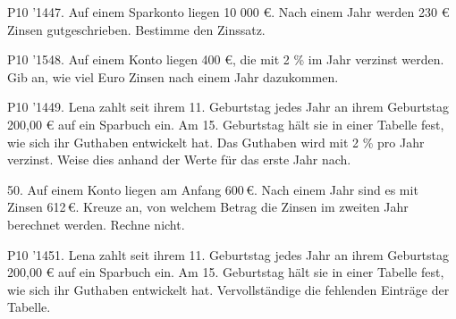 \documentclass[11pt]{article}
\begin{document}
\pfgruppe{}
\begin{pfaufg}{P10 ’14}{47.}{}
Auf einem Sparkonto liegen 10 000 €. Nach einem Jahr werden 230 € Zinsen gutgeschrieben. Bestimme den Zinssatz.
\end{pfaufg}
\begin{pfaufg}{P10 ’15}{48.}{}
Auf einem Konto liegen 400 €, die mit 2 \% im Jahr verzinst werden. Gib an, wie viel Euro Zinsen nach einem Jahr dazukommen.
\end{pfaufg}
\pfgruppe{}
\begin{pfaufg}{P10 ’14}{49.}{}
Lena zahlt seit ihrem 11. Geburtstag jedes Jahr an ihrem Geburtstag 200,00 € auf ein Sparbuch ein. Am 15. Geburtstag hält sie in einer Tabelle fest, wie sich ihr Guthaben entwickelt hat. Das Guthaben wird mit 2 \% pro Jahr verzinst. Weise dies anhand der Werte für das erste Jahr nach.
\par\smallskip\noindent {}\par
{}
\end{pfaufg}
\pfgruppe{}
\begin{pfaufg}{}{50.}{}
Auf einem Konto liegen am Anfang 600\,€. Nach einem Jahr sind es mit Zinsen 612\,€. Kreuze an, von welchem Betrag die Zinsen im zweiten Jahr berechnet werden. Rechne nicht. 
\end{pfaufg}
\pfgruppe{}
\begin{pfaufg}{P10 ’14}{51.}{}
Lena zahlt seit ihrem 11. Geburtstag jedes Jahr an ihrem Geburtstag 200,00 € auf ein Sparbuch ein. Am 15. Geburtstag hält sie in einer Tabelle fest, wie sich ihr Guthaben entwickelt hat. Vervollständige die fehlenden Einträge der Tabelle.
\par\smallskip\noindent {}\par
{}
\end{pfaufg}
\end{document}
